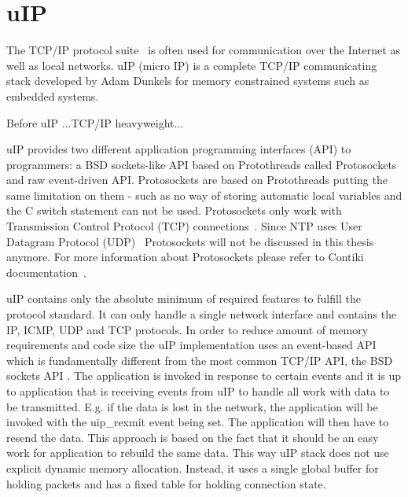 
\section{uIP}\label{sec:contiki-uip}
The TCP/IP protocol suite~\cite{rfc1180} is often used for communication over the Internet as well as local networks.
uIP (micro IP) is a complete TCP/IP communicating stack developed by Adam Dunkels
for memory constrained systems such as embedded systems.

Before uIP ...TCP/IP heavyweight...
\!

uIP provides two different application programming interfaces (API) to programmers:
a BSD sockets-like API based on Protothreads called Protosockets and raw event-driven API.
Protosockets are based on Protothreads putting the same limitation on them - such as 
no way of storing automatic local variables and the C switch statement can not be used.
Protosockets only work with Transmission Control Protocol (TCP) connections~\cite{rfc793, contiki-docs}.
Since NTP uses User Datagram Protocol (UDP)~\cite{rfc768} Protosockets will not be
discussed in this thesis anymore. For more information about Protosockets
please refer to Contiki documentation~\cite{contiki-docs}.

uIP contains only the absolute minimum of required features to fulfill the protocol standard.
It can only handle a single network interface and contains the IP, ICMP, UDP and TCP protocols.
In order to reduce amount of memory requirements and code size the
uIP implementation uses an event-based API which is fundamentally different
from the most common TCP/IP API, the BSD sockets API \cite{thesis-programming}.
The application is invoked in response to certain events and
it is up to application that is receiving events from uIP to handle all
work with data to be transmitted. E.g. if the data is lost in the network,
the application will be invoked with the uip\_rexmit event being set.
The application will then have to resend the data.
This approach is based on the fact that it should be an easy work for application
to rebuild the same data.
This way uIP stack does not use explicit dynamic memory allocation.
Instead, it uses a single global buffer for holding packets and has a fixed
table for holding connection state.

